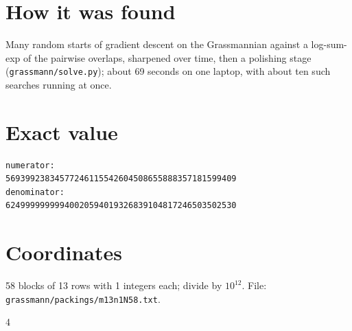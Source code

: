 \documentclass[11pt,a4paper]{article}
\begin{document}
\section{How it was found}
Many random starts of gradient descent on the Grassmannian against a log-sum-exp of the pairwise overlaps, sharpened over time, then a polishing stage (\texttt{grassmann/solve.py}); about 69 seconds on one laptop, with about ten such searches running at once.


\appendix
\section{Exact value}
{\small
\begin{verbatim}
numerator:
56939923834577246115542604508655888357181599409
denominator:
62499999999940020594019326839104817246503502530
\end{verbatim}}

\section{Coordinates}
58 blocks of 13 rows with 1 integers each; divide by $10^{12}$. File: \texttt{grassmann/packings/m13n1N58.txt}.
{\tiny
\begin{multicols}{4}
\end{multicols}}
\end{document}
